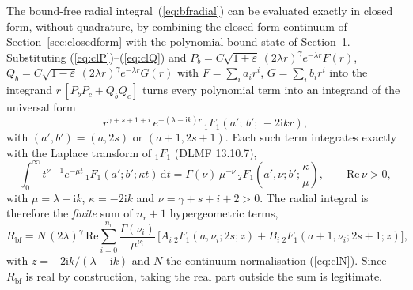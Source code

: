 \documentclass[11pt,a4paper]{article}
\newcommand{\dif}{\mathrm{d}}
\newcommand{\iu}{\mathrm{i}}
\begin{document}
The bound-free radial integral~(\ref{eq:bfradial}) can be evaluated
exactly in closed form, without quadrature, by combining the closed-form
continuum of Section~\ref{sec:closedform} with the polynomial bound state
of Section~1.  Substituting (\ref{eq:clP})--(\ref{eq:clQ}) and
$P_{b}=C\sqrt{1+\varepsilon}\,(2\lambda r)^{\gamma}e^{-\lambda r}F(r)$,
$Q_{b}=C\sqrt{1-\varepsilon}\,(2\lambda r)^{\gamma}e^{-\lambda r}G(r)$
with $F=\sum_{i}a_{i}r^{i}$, $G=\sum_{i}b_{i}r^{i}$ into the integrand
$r\,[P_{b}P_{c}+Q_{b}Q_{c}]$ turns every polynomial term into an integrand
of the universal form
\begin{equation}
  r^{\gamma+s+1+i}\,e^{-(\lambda-\iu k)r}\,
  {}_{1}F_{1}\!\left(a';\,b';\,-2\iu kr\right),
  \label{eq:bf1f1term}
\end{equation}
with $(a',b')=(a,2s)$ or $(a{+}1,2s{+}1)$.  Each such term integrates
exactly with the Laplace transform of ${}_{1}F_{1}$ (DLMF 13.10.7),
\begin{equation}
  \int_{0}^{\infty}\!t^{\nu-1}e^{-\mu t}\,
  {}_{1}F_{1}(a';b';\kappa t)\,\dif t
  =\Gamma(\nu)\,\mu^{-\nu}\,
  {}_{2}F_{1}\!\left(a',\nu;b';\frac{\kappa}{\mu}\right),
  \qquad \mathrm{Re}\,\nu>0,
  \label{eq:laplace1f1}
\end{equation}
with $\mu=\lambda-\iu k$, $\kappa=-2\iu k$ and $\nu=\gamma+s+i+2>0$.
The radial integral is therefore the \emph{finite} sum of $n_{r}+1$
hypergeometric terms,
\begin{equation}
  R_{\mathrm{bf}}=N\,(2\lambda)^{\gamma}\,
  \mathrm{Re}\sum_{i=0}^{n_{r}}
  \frac{\Gamma(\nu_{i})}{\mu^{\nu_{i}}}\,
  \bigl[A_{i}\,{}_{2}F_{1}(a,\nu_{i};2s;z)
      +B_{i}\,{}_{2}F_{1}(a{+}1,\nu_{i};2s{+}1;z)\bigr],
  \label{eq:bfanalytic}
\end{equation}
with $z=-2\iu k/(\lambda-\iu k)$ and $N$ the continuum normalisation
(\ref{eq:clN}).  Since $R_{\mathrm{bf}}$ is real by construction, taking
the real part outside the sum is legitimate.
\end{document}
